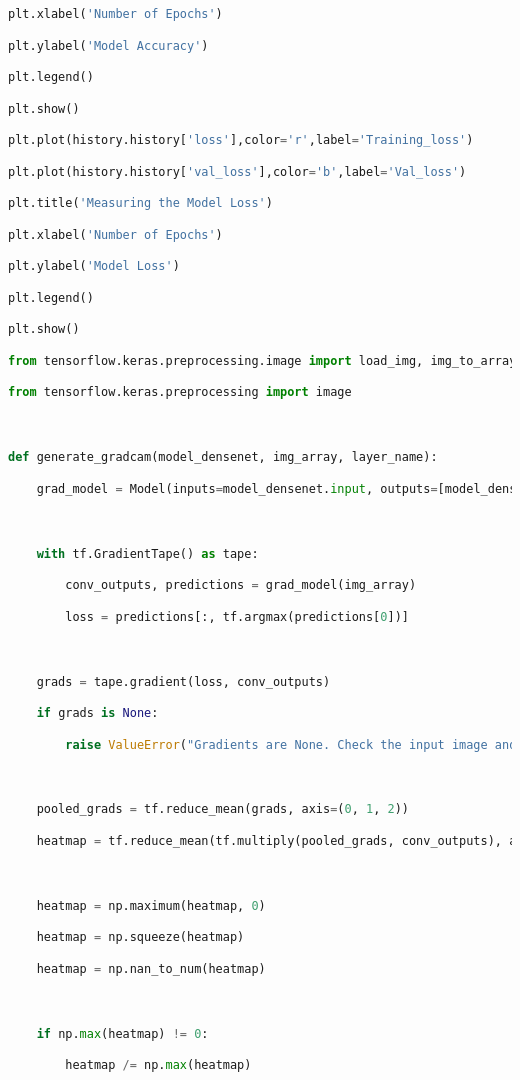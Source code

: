 \documentclass{article}
\begin{document}
\begin{lstlisting}[style=mystyle,language=Python]
plt.xlabel('Number of Epochs')

plt.ylabel('Model Accuracy')

plt.legend()

plt.show()

plt.plot(history.history['loss'],color='r',label='Training_loss')

plt.plot(history.history['val_loss'],color='b',label='Val_loss')

plt.title('Measuring the Model Loss')

plt.xlabel('Number of Epochs')

plt.ylabel('Model Loss')

plt.legend()

plt.show()

from tensorflow.keras.preprocessing.image import load_img, img_to_array

from tensorflow.keras.preprocessing import image



def generate_gradcam(model_densenet, img_array, layer_name):

    grad_model = Model(inputs=model_densenet.input, outputs=[model_densenet.get_layer(layer_name).output, model_densenet.output])



    with tf.GradientTape() as tape:

        conv_outputs, predictions = grad_model(img_array)

        loss = predictions[:, tf.argmax(predictions[0])]



    grads = tape.gradient(loss, conv_outputs)

    if grads is None:

        raise ValueError("Gradients are None. Check the input image and model.")



    pooled_grads = tf.reduce_mean(grads, axis=(0, 1, 2))

    heatmap = tf.reduce_mean(tf.multiply(pooled_grads, conv_outputs), axis=-1)



    heatmap = np.maximum(heatmap, 0)

    heatmap = np.squeeze(heatmap)

    heatmap = np.nan_to_num(heatmap)



    if np.max(heatmap) != 0:

        heatmap /= np.max(heatmap)




\end{lstlisting}
\end{document}
